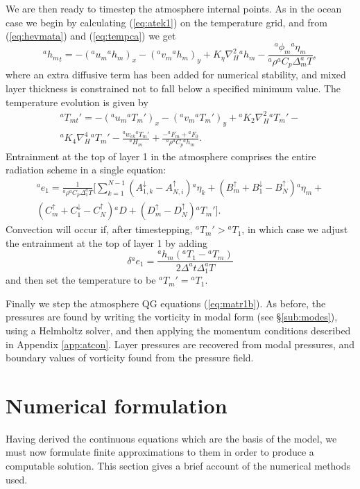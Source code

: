 \documentclass[11pt, a4paper,twoside]{article}
\newcommand{\dt}[2]{\Delta_{#2}^{#1}T}
\newcommand{\etb}[2]{{{}^{#1}\eta_{#2}}}
\newcommand{\rhb}[1]{{{}^{#1}\rho}}
\newcommand{\cp}[1]{{{}^{#1}C_p}}
\newcommand{\uu}[2]{{{}^{#1}u_{#2}}}
\newcommand{\vv}[2]{{{}^{#1}v_{#2}}}
\newcommand{\ek}[1]{{{}^{#1}w_{ek}}}
\newcommand{\HH}[2]{{{}^{#1}H_{#2}}}
\newcommand{\kh}[1]{{{}^{#1}K_2}}
\newcommand{\kf}[1]{{{}^{#1}K_4}}
\newcommand{\e}[2]{{{}^{#1}e_{#2}}}
\newcommand{\h}[2]{{{}^{#1}h_{#2}}}
\newcommand{\T}[2]{{{}^{#1}T_{#2}}}
\newcommand{\aup}[1]{A^{\uparrow}_{#1}}
\newcommand{\adown}[1]{A^{\downarrow}_{#1}}
\newcommand{\bup}[1]{B^{\uparrow}_{#1}}
\newcommand{\cupp}[1]{C^{\uparrow}_{#1}}
\newcommand{\bdown}[1]{B^{\downarrow}_{#1}}
\newcommand{\cdown}[1]{C^{\downarrow}_{#1}}
\newcommand{\dup}[1]{D^{\uparrow}_{#1}}
\newcommand{\F}[3]{{{}^{#1}F^{#3}_{#2}}}
\newcommand{\lb}[2]{{{}^{#1}\phi_{#2}}}
\newcommand{\D}[1]{{}^{#1}D}
\numberwithin{equation}{section}
\begin{document}
We are then ready to timestep the atmosphere internal points.
As in the ocean case we begin by calculating (\ref{eq:atek1}) on the temperature grid, and from (\ref{eq:hevmata}) and (\ref{eq:tempca}) we get
\begin{equation}\label{eq:hevmatb}
\h{a}{m}_t = - (\uu{a}{m}\h{a}{m})_x - (\vv{a}{m} \h{a}{m})_y  +  K_{\eta}  \nabla_H^2 \h{a}{m}  - \frac{\lb{a}{m}\etb{a}{m} }{\rhb{a} \cp{a}\dt{a}{m}},
\end{equation}
where an extra diffusive term has been added for numerical stability, and mixed layer thickness is constrained not to fall below a specified minimum value.
The temperature evolution is given by
\begin{multline}\label{eq:tempcc}
\T{a}{mt}' = - (\uu{a}{m} \T{a}{m}')_x - (\vv{a}{m} \T{a}{m}')_y +  \kh{a}  \nabla_H^2 \T{a}{m}' - \\
\kf{a}\nabla_H^4\T{a}{m}' - \frac{\ek{a} \T{a}{m}'}{\HH{a}{m}} +\frac{-\F{a}{m}{} + \F{a}{0}{}}{\rhb{a} \cp{a} \h{a}{m}}.
\end{multline}
Entrainment at the top of layer 1 in the atmosphere comprises the entire radiation scheme in a single equation:
\begin{multline}\label{eq:ent1c}
\e{a}{1} = \frac{1}{\rhb{a} \cp{a} \dt{a}{1} } \biggl[\sum_{k=1}^{N-1} \left(\adown{1,k}  -  \aup{N,i} \right)\etb{a}{k} + \left(\bup{m} + \bdown{1} - \bup{N} \right)\etb{a}{m} + \\
\left( \cupp{m} + \cdown{1}  - \cupp{N} \right) \D{a} + \left(\dup{m} -  \dup{N}\right)\T{a}{m}' \biggr].
\end{multline}
Convection will occur if, after timestepping, $\T{a}{m}' > \T{a}{1}$, in which case we adjust the entrainment at the top of layer 1 by adding
\begin{equation}\label{eq:atconv1}
 \delta \e{a}{1}= \frac{\h{a}{m}(\T{a}{1} - \T{a}{m} )}{2 \Delta^at \dt{a}{1} }
\end{equation}
and then set the temperature to be $\T{a}{m}' = \T{a}{1}.$

Finally we step the atmosphere QG equations (\ref{eq:matr1b}).
As before, the pressures are found by writing the vorticity in modal form (see \S\ref{sub:modes}), using a Helmholtz solver, and then applying the momentum conditions described in Appendix \ref{app:atcon}.
Layer pressures are recovered from modal pressures, and boundary values of vorticity found from the pressure field.

\section{Numerical formulation}
Having derived the continuous equations which are the basis of the model, we must now formulate finite approximations to them in order to produce a computable solution.
This section gives a brief account of the numerical methods used.
\end{document}

